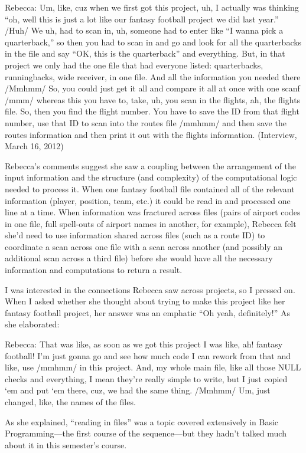 Rebecca: Um, like, cuz when we first got this project, uh, I actually was thinking ``oh, well this is just a lot like our fantasy football project we did last year.'' /Huh/ We uh, had to scan in, uh, someone had to enter like ``I wanna pick a quarterback,'' so then you had to scan in and go and look for all the quarterbacks in the file and say ``OK, this is the quarterback'' and everything. But, in that project we only had the one file that had everyone listed: quarterbacks, runningbacks, wide receiver, in one file. And all the information you needed there /Mmhmm/ So, you could just get it all and compare it all at once with one scanf /mmm/ whereas this you have to, take, uh, you scan in the flights, ah, the flights file. So, then you find the flight number. You have to save the ID from that flight number, use that ID to scan into the routes file /mmhmm/ and then save the routes information and then print it out with the flights information. (Interview, March 16, 2012)

Rebecca's comments suggest she saw a coupling between the arrangement of the input information and the structure (and complexity) of the computational logic needed to process it. When one fantasy football file contained all of the relevant information (player, position, team, etc.) it could be read in and processed one line at a time. When information was fractured across files (pairs of airport codes in one file, full spell-outs of airport names in another, for example), Rebecca felt she'd need to use information shared across files (such as a route ID) to coordinate a scan across one file with a scan across another (and possibly an additional scan across a third file) before she would have all the necessary information and computations to return a result.

I was interested in the connections Rebecca saw across projects, so I pressed on. When I asked whether she thought about trying to make this project like her fantasy football project, her answer was an emphatic ``Oh yeah, definitely!'' As she elaborated:

Rebecca: That was like, as soon as we got this project I was like, ah! fantasy football! I'm just gonna go and see how much code I can rework from that and like, use /mmhmm/ in this project. And, my whole main file, like all those NULL checks and everything, I mean they're really simple to write, but I just copied `em and put `em there, cuz, we had the same thing. /Mmhmm/ Um, just changed, like, the names of the files.

As she explained, ``reading in files'' was a topic covered extensively in Basic Programming---the first course of the sequence---but they hadn't talked much about it in this semester's course.

